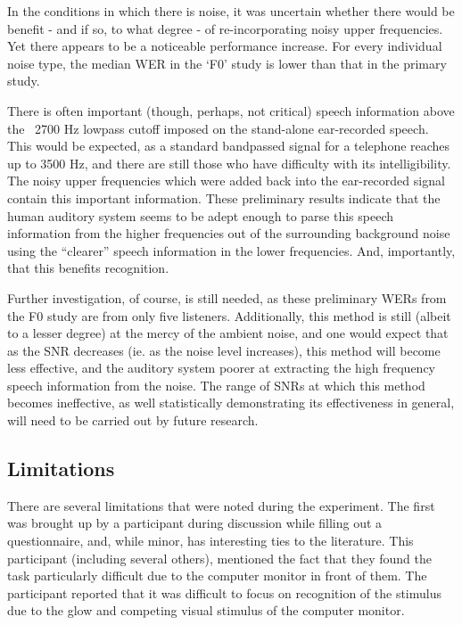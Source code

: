 \documentclass[dissertation,copyright]{uathesis}
\begin{document}
In the conditions in which there is noise, it was uncertain whether there would be benefit - and if so, to what degree - of re-incorporating noisy upper frequencies.  Yet there appears to be a noticeable performance increase.  For every individual noise type, the median WER in the `F0' study is lower than that in the primary study. 

There is often important (though, perhaps, not critical) speech information above the ~2700 Hz lowpass cutoff imposed on the stand-alone ear-recorded speech.  This would be expected, as a standard bandpassed signal for a telephone reaches up to 3500 Hz, and there are still those who have difficulty with its intelligibility.  The noisy upper frequencies which were added back into the ear-recorded signal contain this important information.  These preliminary results indicate that the human auditory system seems to be adept enough to parse this speech information from the higher frequencies out of the surrounding background noise using the ``clearer'' speech information in the lower frequencies.  And, importantly, that this benefits recognition.

Further investigation, of course, is still needed, as these preliminary WERs from the F0 study are from only five listeners.  Additionally, this method is still (albeit to a lesser degree) at the mercy of the ambient noise, and one would expect that as the SNR decreases (ie. as the noise level increases), this method will become less effective, and the auditory system poorer at extracting the high frequency speech information from the noise.  The range of SNRs at which this method becomes ineffective, as well statistically demonstrating its effectiveness in general, will need to be carried out by future research.

\subsection{Limitations}

There are several limitations that were noted during the experiment.  The first was brought up by a participant during discussion while filling out a questionnaire, and, while minor, has interesting ties to the literature.  This participant (including several others), mentioned the fact that they found the task particularly difficult due to the computer monitor in front of them.  The participant reported that it was difficult to focus on recognition of the stimulus due to the glow and competing visual stimulus of the computer monitor.
\end{document}

